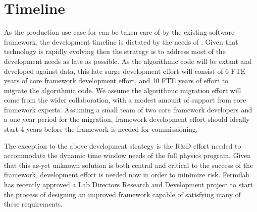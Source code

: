\documentclass[../main-v1.tex]{subfiles}
\begin{document}
\section{Timeline}

As the production use case for  can be taken care of by the existing software framework, the development timeline is dictated by the needs of .  Given that technology is rapidly evolving then the strategy is to address most of the development needs as late as possible. As the algorithmic code will be extant and developed against  data, this late surge development effort will consist of 6 FTE years of core framework development effort, and 10 FTE years of effort to migrate the algorithmic code.  We assume the algorithmic migration effort will come from the wider collaboration, with a modest amount of support from core framework experts.
Assuming a small team of two core framework developers
and a one year period for the migration, framework development effort should ideally start 4 years before the framework is needed for commissioning.

The exception to the above development strategy is the R\&D effort needed to accommodate the dynamic time window needs of the full  physics program.  Given that this as-yet unknown solution is both central and critical to the success of the framework, development effort is needed now in order to minimize risk.
Fermilab has recently approved a Lab Directors Research and Development project to start the process of designing an improved framework capable of satisfying many of these requirements. 




\end{document}
